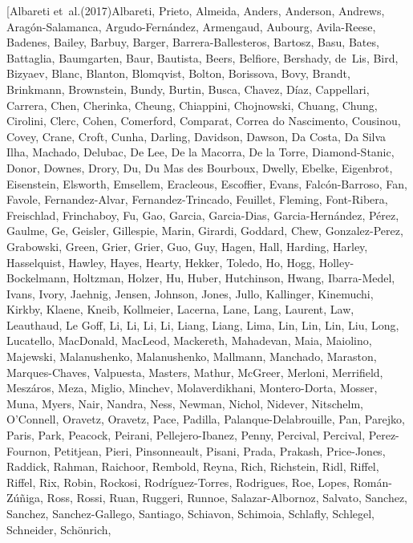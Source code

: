 \documentclass[apj, revtex4-1]{emulateapj}
\begin{document}
\begin{thebibliography}{}
\bibitem[{Albareti {et~al.}(2017)Albareti, Prieto, Almeida, Anders, Anderson,
  Andrews, Arag{\'{o}}n-Salamanca, Argudo-Fern{\'{a}}ndez, Armengaud, Aubourg,
  Avila-Reese, Badenes, Bailey, Barbuy, Barger, Barrera-Ballesteros, Bartosz,
  Basu, Bates, Battaglia, Baumgarten, Baur, Bautista, Beers, Belfiore,
  Bershady, de~Lis, Bird, Bizyaev, Blanc, Blanton, Blomqvist, Bolton,
  Borissova, Bovy, Brandt, Brinkmann, Brownstein, Bundy, Burtin, Busca, Chavez,
  D{\'{i}}az, Cappellari, Carrera, Chen, Cherinka, Cheung, Chiappini,
  Chojnowski, Chuang, Chung, Cirolini, Clerc, Cohen, Comerford, Comparat,
  {Correa do Nascimento}, Cousinou, Covey, Crane, Croft, Cunha, Darling,
  Davidson, Dawson, {Da Costa}, {Da Silva Ilha}, Machado, Delubac, {De Lee},
  {De la Macorra}, {De la Torre}, Diamond-Stanic, Donor, Downes, Drory, Du, {Du
  Mas des Bourboux}, Dwelly, Ebelke, Eigenbrot, Eisenstein, Elsworth, Emsellem,
  Eracleous, Escoffier, Evans, Falc{\'{o}}n-Barroso, Fan, Favole,
  Fernandez-Alvar, Fernandez-Trincado, Feuillet, Fleming, Font-Ribera,
  Freischlad, Frinchaboy, Fu, Gao, Garcia, Garcia-Dias, Garcia-Hern{\'{a}}ndez,
  P{\'{e}}rez, Gaulme, Ge, Geisler, Gillespie, Marin, Girardi, Goddard, Chew,
  Gonzalez-Perez, Grabowski, Green, Grier, Grier, Guo, Guy, Hagen, Hall,
  Harding, Harley, Hasselquist, Hawley, Hayes, Hearty, Hekker, Toledo, Ho,
  Hogg, Holley-Bockelmann, Holtzman, Holzer, Hu, Huber, Hutchinson, Hwang,
  Ibarra-Medel, Ivans, Ivory, Jaehnig, Jensen, Johnson, Jones, Jullo,
  Kallinger, Kinemuchi, Kirkby, Klaene, Kneib, Kollmeier, Lacerna, Lane, Lang,
  Laurent, Law, Leauthaud, {Le Goff}, Li, Li, Li, Li, Liang, Liang, Lima, Lin,
  Lin, Lin, Liu, Long, Lucatello, MacDonald, MacLeod, Mackereth, Mahadevan,
  Maia, Maiolino, Majewski, Malanushenko, Malanushenko, Mallmann, Manchado,
  Maraston, Marques-Chaves, Valpuesta, Masters, Mathur, McGreer, Merloni,
  Merrifield, Mesz{\'{a}}ros, Meza, Miglio, Minchev, Molaverdikhani,
  Montero-Dorta, Mosser, Muna, Myers, Nair, Nandra, Ness, Newman, Nichol,
  Nidever, Nitschelm, O'Connell, Oravetz, Oravetz, Pace, Padilla,
  Palanque-Delabrouille, Pan, Parejko, Paris, Park, Peacock, Peirani,
  Pellejero-Ibanez, Penny, Percival, Percival, Perez-Fournon, Petitjean, Pieri,
  Pinsonneault, Pisani, Prada, Prakash, Price-Jones, Raddick, Rahman, Raichoor,
  Rembold, Reyna, Rich, Richstein, Ridl, Riffel, Riffel, Rix, Robin, Rockosi,
  Rodr{\'{i}}guez-Torres, Rodrigues, Roe, Lopes,
  Rom{\'{a}}n-Z{\'{u}}{\~{n}}iga, Ross, Rossi, Ruan, Ruggeri, Runnoe,
  Salazar-Albornoz, Salvato, Sanchez, Sanchez, Sanchez-Gallego, Santiago,
  Schiavon, Schimoia, Schlafly, Schlegel, Schneider, Sch{\"{o}}nrich,
}
\end{thebibliography}
\end{document}
